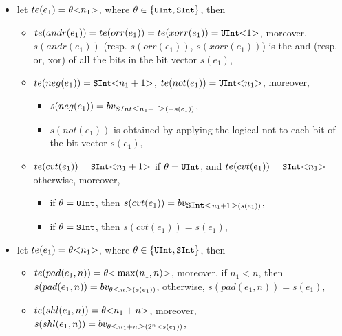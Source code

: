 \begin{itemize}
\begin{itemize}
%
\item $te(dshr(e_1, e_2)) = \theta \bwidth{n_1}$ and $s(dshr(e_1, e_2)) = bv_{\theta \bwidth{n_1}(s(e_1) \div 2^{s(e_2)})}$,
%
\end{itemize}
%
\item let $te(e_1) = \theta \mbox{<} n_1 \mbox{>}$, where $\theta \in \{\mbox{\prettyll{UInt}}, \mbox{\prettyll{SInt}}\}$, then
\begin{itemize}
\item $te(andr(e_1)) = te(orr(e_1)) =  te(xorr(e_1)) = \uint{1}$, moreover, $s(andr(e_1))$ (resp. $s(orr(e_1))$, $s(xorr(e_1))$) is the and (resp. or, xor) of all the bits in the bit vector $s(e_1)$,
%
\item $te(neg(e_1)) = \sint{n_1 +1}$, $te(not(e_1)) =  \uint{n_1}$, moreover,
\begin{itemize}
\item $s(neg(e_1)) = bv_{SInt\mbox{<} n_1+1 \mbox{>}(-s(e_1))}$,
%
\item $s(not(e_1))$ is obtained by applying the logical not to each bit of the bit vector $s(e_1)$,
\end{itemize}
%
%
\item $te(cvt(e_1)) = \sint{n_1 +1}$ if $\theta = \mbox{\prettyll{UInt}}$, and $te(cvt(e_1)) =  \sint{n_1}$ otherwise,  moreover,
\begin{itemize}
\item if $\theta = \mbox{\prettyll{UInt}}$, then $s(cvt(e_1)) = bv_{\mbox{\prettyll{SInt}}\bwidth{n_1+1}(s(e_1))}$,
%
\item if $\theta = \mbox{\prettyll{SInt}}$, then $s(cvt(e_1)) = s(e_1)$,
\end{itemize}
\end{itemize}
%
\item let $te(e_1) = \theta \mbox{<} n_1 \mbox{>}$, where $\theta \in \{\mbox{\prettyll{UInt}}, \mbox{\prettyll{SInt}}\}$, then
\begin{itemize}
\item $te(pad(e_1, n)) = \theta\mbox{<} \max(n_1, n) \mbox{>}$, moreover, if $n_1 < n$, then $s(pad(e_1,n)) = bv_{\theta\mbox{<} n \mbox{>}(s(e_1))}$, otherwise, $s(pad(e_1,n)) = s(e_1)$,
%
\item $te(shl(e_1,n)) = \theta \mbox{<} n_1 + n \mbox{>}$, moreover, $s(shl(e_1,n)) =  bv_{\theta\mbox{<} n_1 + n \mbox{>}(2^{n} \times s(e_1))}$,

\end{itemize}
\end{itemize}
